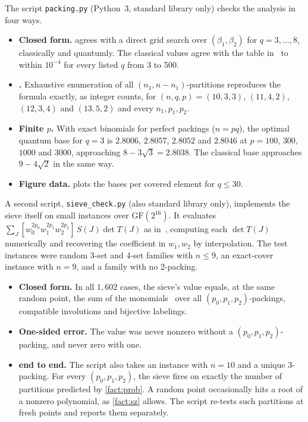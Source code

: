 \documentclass[11pt,a4paper]{article}
\theoremstyle{plain}
\theoremstyle{remark}
\newcommand{\GF}{\mathrm{GF}}
\begin{document}
The script \texttt{packing.py} (Python~3, standard library only) checks the analysis in four ways.
\begin{itemize}[nosep]
  \item \textbf{Closed form.}  agrees with a direct grid search over $(\beta_1,\beta_2)$ for $q = 3,\dots,8$, classically and quantumly. The classical values agree with the table in~\cite{bhkk} to within $10^{-4}$ for every listed $q$ from 3 to 500.
  \item \textbf{.} Exhaustive enumeration of all $(n_1,n-n_1)$-partitions reproduces the formula exactly, as integer counts, for $(n,q,p) = (10,3,3)$, $(11,4,2)$, $(12,3,4)$ and $(13,5,2)$ and every $n_1,p_1,p_2$.
  \item \textbf{Finite $p$.} With exact binomials for perfect packings ($n = pq$), the optimal quantum base for $q = 3$ is $2.8006$, $2.8057$, $2.8052$ and $2.8046$ at $p = 100$, $300$, $1000$ and $3000$, approaching $8 - 3\sqrt3 = 2.8038$. The classical base approaches $9 - 4\sqrt2$ in the same way.
  \item \textbf{Figure data.}  plots the bases per covered element for $q \le 30$.
\end{itemize}
A second script, \texttt{sieve\_check.py} (also standard library only), implements the sieve itself on small instances over $\GF(2^{16})$. It evaluates $\sum_J [w_0^{2p_0}w_1^{2p_1}w_2^{2p_2}]\,S(J)\det T(J)$ as in~\cite[(20)--(24)]{bhkk}, computing each $\det T(J)$ numerically and recovering the coefficient in $w_1, w_2$ by interpolation. The test instances were random 3-set and 4-set families with $n \le 9$, an exact-cover instance with $n = 9$, and a family with no 2-packing.
\begin{itemize}[nosep]
  \item \textbf{Closed form.} In all $1{,}602$ cases, the sieve's value equals, at the same random point, the sum of the monomials~\cite[(18)]{bhkk} over all $(p_0,p_1,p_2)$-packings, compatible involutions and bijective labelings.
  \item \textbf{One-sided error.} The value was never nonzero without a $(p_0,p_1,p_2)$-packing, and never zero with one.
  \item \textbf{ end to end.} The script also takes an instance with $n = 10$ and a unique 3-packing. For every $(p_0,p_1,p_2)$, the sieve fires on exactly the number of partitions predicted by \cref{fact:prob}. A random point occasionally hits a root of a nonzero polynomial, as \cref{fact:sz} allows. The script re-tests such partitions at fresh points and reports them separately.
\end{itemize}
\end{document}
